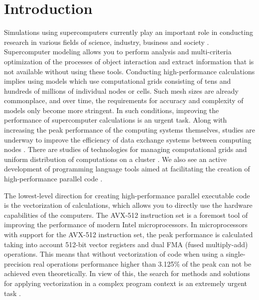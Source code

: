 \documentclass[
11pt,%
tightenlines,%
twoside,%
onecolumn,%
nofloats,%
nobibnotes,%
nofootinbib,%
superscriptaddress,%
noshowpacs,%
centertags]%
{revtex4}
\begin{document}


\maketitle

\section{Introduction}

Simulations using supercomputers currently play an important role in conducting research in various fields of science, industry, business and society \cite{FadeevWheather, HuSeismic, JonesFluid}.
Supercomputer modeling allows you to perform analysis and multi-criteria optimization of the processes of object interaction and extract information that is not available without using these tools.
Conducting high-performance calculations implies using models which use computational grids consisting of tens and hundreds of millions of individual nodes or cells.
Such mesh sizes are already commonplace, and over time, the requirements for accuracy and complexity of models only become more stringent.
In such conditions, improving the performance of supercomputer calculations is an urgent task.
Along with increasing the peak performance of the computing systems themselves, studies are underway to improve the efficiency of data exchange systems between computing nodes \cite{KalantzisMPI}. There are studies of technologies for managing computational grids \cite{Rybakov} and uniform distribution of computations on a cluster \cite{BaranovWorkload}. We also see an active development of programming language tools aimed at facilitating the creation of high-performance parallel code \cite{DoerfertPar}.

The lowest-level direction for creating high-performance parallel executable code is the vectorization of calculations, which allows you to directly use the hardware capabilities of the computers.
The AVX-512 instruction set is a foremost tool of improving the performance of modern Intel microprocessors.
In microprocessors with support for the AVX-512 instruction set, the peak performance is calculated taking into account 512-bit vector registers and dual FMA (fused multiply-add) operations.
This means that without vectorization of code when using a single-precision real operations performance higher than 3.125\% of the peak can not be achieved even theoretically.
In view of this, the search for methods and solutions for applying vectorization in a complex program context is an extremely urgent task \cite{ShabanovVec}.
\end{document}
